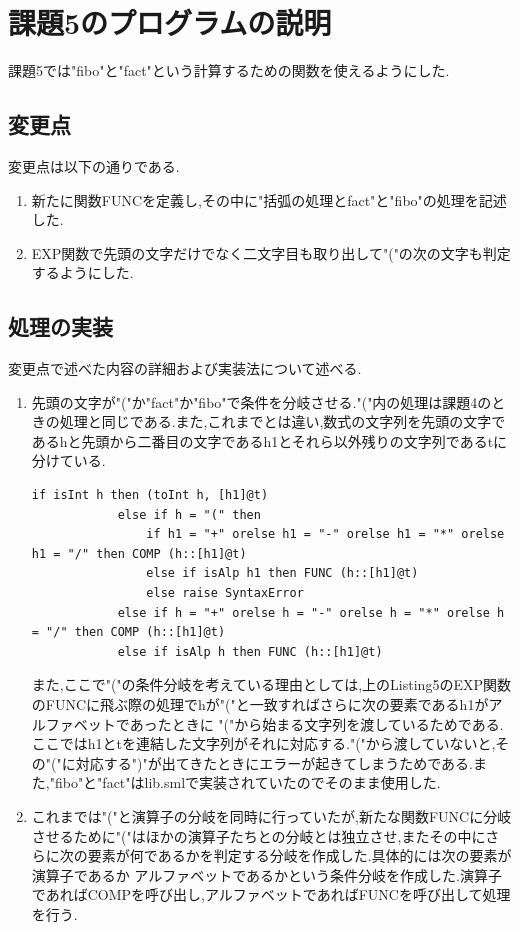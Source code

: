 \documentclass[dvipdfmx]{jarticle}
\begin{document}
\section{課題5のプログラムの説明}

課題5では"fibo"と"fact"という計算するための関数を使えるようにした.
\subsection{変更点}
変更点は以下の通りである.\\
\begin{enumerate}
    \item 新たに関数FUNCを定義し,その中に"括弧の処理とfact"と"fibo"の処理を記述した.
    \item EXP関数で先頭の文字だけでなく二文字目も取り出して"("の次の文字も判定するようにした.
\end{enumerate}

\subsection{処理の実装}
変更点で述べた内容の詳細および実装法について述べる.
\begin{enumerate}
    \item 先頭の文字が"("か"fact"か"fibo"で条件を分岐させる."("内の処理は課題4のときの処理と同じである.また,これまでとは違い,数式の文字列を先頭の文字であるhと先頭から二番目の文字であるh1とそれら以外残りの文字列であるtに分けている.
    \begin{lstlisting}[caption = EXP関数の一部,label = fuga]
        if isInt h then (toInt h, [h1]@t)
            else if h = "(" then
                if h1 = "+" orelse h1 = "-" orelse h1 = "*" orelse h1 = "/" then COMP (h::[h1]@t)
                else if isAlp h1 then FUNC (h::[h1]@t)
                else raise SyntaxError
            else if h = "+" orelse h = "-" orelse h = "*" orelse h = "/" then COMP (h::[h1]@t)
            else if isAlp h then FUNC (h::[h1]@t)
    \end{lstlisting}
    また,ここで"("の条件分岐を考えている理由としては,上のListing5のEXP関数のFUNCに飛ぶ際の処理でhが"("と一致すればさらに次の要素であるh1がアルファベットであったときに
    "("から始まる文字列を渡しているためである.ここではh1とtを連結した文字列がそれに対応する."("から渡していないと,その"("に対応する")"が出てきたときにエラーが起きてしまうためである.また,"fibo"と"fact"はlib.smlで実装されていたのでそのまま使用した.
    \item これまでは"("と演算子の分岐を同時に行っていたが,新たな関数FUNCに分岐させるために"("はほかの演算子たちとの分岐とは独立させ,またその中にさらに次の要素が何であるかを判定する分岐を作成した.具体的には次の要素が演算子であるか
    アルファベットであるかという条件分岐を作成した.演算子であればCOMPを呼び出し,アルファベットであればFUNCを呼び出して処理を行う.
\end{enumerate}
\end{document}
